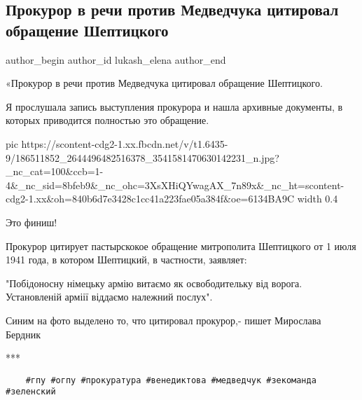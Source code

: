  
 
 
 
 
 
\subsection{Прокурор в речи против Медведчука цитировал обращение Шептицкого}
\label{sec:16_05_2021.fb.lukash_elena.1.sheptickij_obraschenie_nacizm}
 
\ifcmt
 author_begin
   author_id lukash_elena
 author_end
\fi

«Прокурор в речи против Медведчука цитировал обращение Шептицкого. 

Я прослушала запись выступления прокурора и нашла архивные документы, в которых
приводится полностью это обращение.

\ifcmt
  pic https://scontent-cdg2-1.xx.fbcdn.net/v/t1.6435-9/186511852_2644496482516378_3541581470630142231_n.jpg?_nc_cat=100&ccb=1-4&_nc_sid=8bfeb9&_nc_ohc=3XsXHiQYwagAX_7n89x&_nc_ht=scontent-cdg2-1.xx&oh=840b6d7e3428c1cc41a223fae05a384f&oe=6134BA9C
  width 0.4
\fi

Это финиш!

Прокурор цитирует пастырскокое обращение митрополита Шептицкого от 1 июля 1941
года, в котором Шептицкий, в частности, заявляет:

 "Побідоносну німецьку армію витаємо як освободительку від ворога. Установленій
 арміії віддаємо належний послух".

Синим на фото выделено то, что цитировал прокурор,- пишет Мирослава Бердник

***

\begin{verbatim}
	#гпу #огпу #прокуратура #венедиктова #медведчук #зекоманда #зеленский
\end{verbatim}
